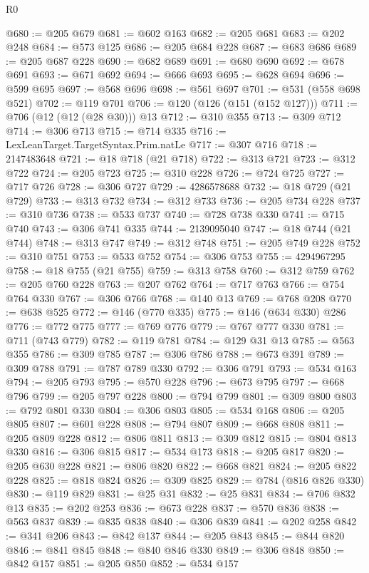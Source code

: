 \begin{lexlean}{R0}
\begin{coremodule}
@680 := @205 @679
@681 := @602 @163
@682 := @205 @681
@683 := @202 @248
@684 := @573 @125
@686 := @205 @684 @228
@687 := @683 @686
@689 := @205 @687 @228
@690 := @682 @689
@691 := @680 @690
@692 := @678 @691
@693 := @671 @692
@694 := @666 @693
@695 := @628 @694
@696 := @599 @695
@697 := @568 @696
@698 := @561 @697
@701 := @531 (@558 @698 @521)
@702 := @119 @701
@706 := @120 (@126 (@151 (@152 @127)))
@711 := @706 (@12 (@12 (@28 @30))) @13
@712 := @310 @355
@713 := @309 @712
@714 := @306 @713
@715 := @714 @335
@716 := LexLeanTarget.TargetSyntax.Prim.natLe
@717 := @307 @716
@718 := 2147483648
@721 := @18 @718 (@21 @718)
@722 := @313 @721
@723 := @312 @722
@724 := @205 @723
@725 := @310 @228
@726 := @724 @725
@727 := @717 @726
@728 := @306 @727
@729 := 4286578688
@732 := @18 @729 (@21 @729)
@733 := @313 @732
@734 := @312 @733
@736 := @205 @734 @228
@737 := @310 @736
@738 := @533 @737
@740 := @728 @738 @330
@741 := @715 @740
@743 := @306 @741 @335
@744 := 2139095040
@747 := @18 @744 (@21 @744)
@748 := @313 @747
@749 := @312 @748
@751 := @205 @749 @228
@752 := @310 @751
@753 := @533 @752
@754 := @306 @753
@755 := 4294967295
@758 := @18 @755 (@21 @755)
@759 := @313 @758
@760 := @312 @759
@762 := @205 @760 @228
@763 := @207 @762
@764 := @717 @763
@766 := @754 @764 @330
@767 := @306 @766
@768 := @140 @13
@769 := @768 @208
@770 := @638 @525
@772 := @146 (@770 @335)
@775 := @146 (@634 @330) @286
@776 := @772 @775
@777 := @769 @776
@779 := @767 @777 @330
@781 := @711 (@743 @779)
@782 := @119 @781
@784 := @129 @31 @13
@785 := @563 @355
@786 := @309 @785
@787 := @306 @786
@788 := @673 @391
@789 := @309 @788
@791 := @787 @789 @330
@792 := @306 @791
@793 := @534 @163
@794 := @205 @793
@795 := @570 @228
@796 := @673 @795
@797 := @668 @796
@799 := @205 @797 @228
@800 := @794 @799
@801 := @309 @800
@803 := @792 @801 @330
@804 := @306 @803
@805 := @534 @168
@806 := @205 @805
@807 := @601 @228
@808 := @794 @807
@809 := @668 @808
@811 := @205 @809 @228
@812 := @806 @811
@813 := @309 @812
@815 := @804 @813 @330
@816 := @306 @815
@817 := @534 @173
@818 := @205 @817
@820 := @205 @630 @228
@821 := @806 @820
@822 := @668 @821
@824 := @205 @822 @228
@825 := @818 @824
@826 := @309 @825
@829 := @784 (@816 @826 @330)
@830 := @119 @829
@831 := @25 @31
@832 := @25 @831
@834 := @706 @832 @13
@835 := @202 @253
@836 := @673 @228
@837 := @570 @836
@838 := @563 @837
@839 := @835 @838
@840 := @306 @839
@841 := @202 @258
@842 := @341 @206
@843 := @842 @137
@844 := @205 @843
@845 := @844 @820
@846 := @841 @845
@848 := @840 @846 @330
@849 := @306 @848
@850 := @842 @157
@851 := @205 @850
@852 := @534 @157

\end{coremodule}
\end{lexlean}
